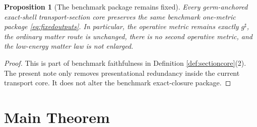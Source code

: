 \documentclass[11pt]{article}
\newcommand{\CompletedMetric}{g^{\sharp}}
\newtheorem{proposition}{Proposition}
\begin{document}
\begin{proposition}[The benchmark package remains fixed]
\label{prop:benchmark}
Every germ-anchored exact-shell transport-section core preserves the same benchmark one-metric package \eqref{eq:fixedoutputs}. In particular, the operative metric remains exactly \(\CompletedMetric\), the ordinary matter route is unchanged, there is no second operative metric, and the low-energy matter law is not enlarged.
\end{proposition}

\begin{proof}
This is part of benchmark faithfulness in Definition \ref{def:sectioncore}(2). The present note only removes presentational redundancy inside the current transport core. It does not alter the benchmark exact-closure package.
\end{proof}

\section{Main Theorem}
\end{document}
